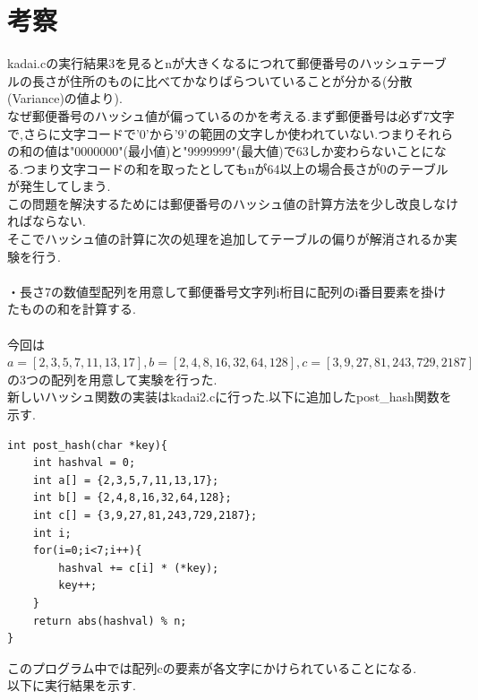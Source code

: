 \documentclass{jsarticle}
\begin{document}
\section{考察}
kadai.cの実行結果3を見るとnが大きくなるにつれて郵便番号のハッシュテーブルの長さが住所のものに比べてかなりばらついていることが分かる(分散(Variance)の値より).\\
なぜ郵便番号のハッシュ値が偏っているのかを考える.まず郵便番号は必ず7文字で,さらに文字コードで'0'から'9'の範囲の文字しか使われていない.つまりそれらの和の値は"0000000"(最小値)と"9999999"(最大値)で63しか変わらないことになる.つまり文字コードの和を取ったとしてもnが64以上の場合長さが0のテーブルが発生してしまう.\\
この問題を解決するためには郵便番号のハッシュ値の計算方法を少し改良しなければならない.\\
そこでハッシュ値の計算に次の処理を追加してテーブルの偏りが解消されるか実験を行う.\\\\
・長さ7の数値型配列を用意して郵便番号文字列i桁目に配列のi番目要素を掛けたものの和を計算する.\\\\
今回は$a=[2,3,5,7,11,13,17], b=[2,4,8,16,32,64,128], c=[3,9,27,81,243,729,2187]$の3つの配列を用意して実験を行った.\\
新しいハッシュ関数の実装はkadai2.cに行った.以下に追加したpost\_hash関数を示す.\\
\begin{lstlisting}[caption = kadai2.c post\_hash]
int post_hash(char *key){
    int hashval = 0;
    int a[] = {2,3,5,7,11,13,17};
    int b[] = {2,4,8,16,32,64,128};
    int c[] = {3,9,27,81,243,729,2187};
    int i;
    for(i=0;i<7;i++){
        hashval += c[i] * (*key);
        key++;
    }
    return abs(hashval) % n;
}
\end{lstlisting}
このプログラム中では配列cの要素が各文字にかけられていることになる.\\
\newpage
以下に実行結果を示す.\\
\end{document}
